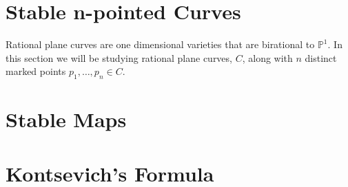 \section{Stable n-pointed Curves}
Rational plane curves are one dimensional varieties that are birational to $\mathbb{P}^{1}$. 
In this section we will be studying rational plane curves, $C$, along with $n$ distinct marked points $p_{1},\dots, p_{n} \in C$.
\section{Stable Maps}
\section{Kontsevich's Formula}
